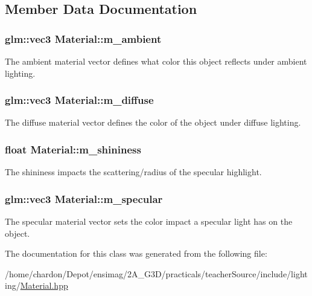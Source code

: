 \subsection{Member Data Documentation}
\hypertarget{classMaterial_ab3b04455ca3a29eea275fe5dd6f70b9b}{
\subsubsection[{m\+\_\+ambient}]{\setlength{\rightskip}{0pt plus 5cm}glm\+::vec3 Material\+::m\+\_\+ambient\hspace{0.3cm}{\ttfamily [private]}}}\label{classMaterial_ab3b04455ca3a29eea275fe5dd6f70b9b}
The ambient material vector defines what color this object reflects under ambient lighting. \hypertarget{classMaterial_a4655998d1721cb070f1e4f92d0dbc239}{
\subsubsection[{m\+\_\+diffuse}]{\setlength{\rightskip}{0pt plus 5cm}glm\+::vec3 Material\+::m\+\_\+diffuse\hspace{0.3cm}{\ttfamily [private]}}}\label{classMaterial_a4655998d1721cb070f1e4f92d0dbc239}
The diffuse material vector defines the color of the object under diffuse lighting. \hypertarget{classMaterial_ac6870095f155d023adb9fa1d02f9be4c}{
\subsubsection[{m\+\_\+shininess}]{\setlength{\rightskip}{0pt plus 5cm}float Material\+::m\+\_\+shininess\hspace{0.3cm}{\ttfamily [private]}}}\label{classMaterial_ac6870095f155d023adb9fa1d02f9be4c}
The shininess impacts the scattering/radius of the specular highlight. \hypertarget{classMaterial_a472d9632e7e9db1e9d6db0e5a40a4cc3}{
\subsubsection[{m\+\_\+specular}]{\setlength{\rightskip}{0pt plus 5cm}glm\+::vec3 Material\+::m\+\_\+specular\hspace{0.3cm}{\ttfamily [private]}}}\label{classMaterial_a472d9632e7e9db1e9d6db0e5a40a4cc3}
The specular material vector sets the color impact a specular light has on the object. 

The documentation for this class was generated from the following file\+:\begin{DoxyCompactItemize}
\item 
/home/chardon/\+Depot/ensimag/2\+A\+\_\+\+G3\+D/practicals/teacher\+Source/include/lighting/\hyperlink{Material_8hpp}{Material.\+hpp}\end{DoxyCompactItemize}
